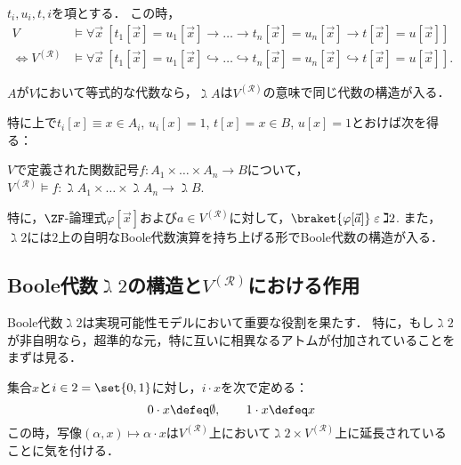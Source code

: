 \documentclass[realisability.tex]{subfiles}
\begin{document}
\begin{theorem}
 $t_i, u_i, t, i$を項とする．
 この時，
\begin{align*}
 V &\models \forall \vec{x}\: \left[t_1[\vec{x}] = u_1[\vec{x}] \to \dots \to t_n[\vec{x}] = u_n[\vec{x}] \to t[\vec{x}] = u[\vec{x}]\right]\\
 \iff 
 V^{(\mathcal{R})} &\models
 \forall \vec{x}\: \left[t_1[\vec{x}] = u_1[\vec{x}] \hookrightarrow \dots \hookrightarrow t_n[\vec{x}] = u_n[\vec{x}] \hookrightarrow t[\vec{x}] = u[\vec{x}]\right].
\end{align*}
\end{theorem}
\begin{corollary}
 $A$が$V$において等式的な代数なら，$\gimel A$は$V^{(\mathcal{R})}$の意味で同じ代数の構造が入る．
\end{corollary}

特に上で$t_i[x] \equiv x \in A_i$, $u_i[x] = 1$, $t[x] = x \in B$, $u[x] = 1$とおけば次を得る：

\begin{theorem}
 $V$で定義された関数記号$f: A_1 \times \dots \times A_n \to B$について，
 $V^{(\mathcal{R})} \models f: \gimel A_1 \times \dots \times \gimel A_n \to \gimel B$.

 特に，$\ZF$-論理式$\varphi[\vec{x}]$および$a \in V^{(\mathcal{R})}$に対して，$\braket{ \varphi[\vec{a}]} \strin \gimel 2$.
 また，$\gimel 2$には$2$上の自明なBoole代数演算を持ち上げる形でBoole代数の構造が入る．
\end{theorem}

\subsection{Boole代数$\gimel 2$の構造と$V^{(\mathcal{R})}$における作用}
Boole代数$\gimel 2$は実現可能性モデルにおいて重要な役割を果たす．
特に，もし$\gimel 2$が非自明なら，超準的な元，特に互いに相異なるアトムが付加されていることをまずは見る．

\begin{definition}
 集合$x$と$i \in 2 = \set{0, 1}$に対し，$i \cdot x$を次で定める：
 \[
  0 \cdot x \defeq \emptyset, \qquad 1 \cdot x \defeq x
 \]
 この時，写像$(\alpha, x) \mapsto \alpha \cdot x$は$V^{(\mathcal{R})}$上において$\gimel 2 \times V^{(\mathcal{R})}$上に延長されていることに気を付ける．
\end{definition}
\end{document}

